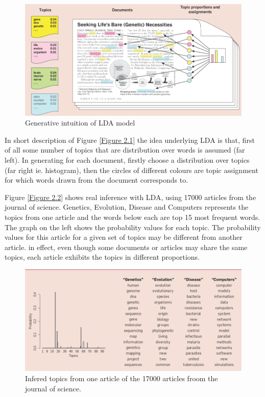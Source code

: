 \begin{figure}[hbtp]
\centering
\includegraphics[scale=0.5]{DLA.png}
\caption{Generative intuition of LDA model}\label{Figure 2.1}
\end{figure}
In short description of Figure \eqref{Figure 2.1} the idea underlying LDA is that, first of all some number of topics that are distribution over words is assumed (far left). In generating for each document, firstly choose a distribution over topics (far right ie. histogram), then the circles of different colours are topic assignment for which words drawn from the document corresponds to.

Figure \eqref{Figure 2.2} shows real inference with LDA, using 17000 articles from the journal of science. Genetics, Evolution, Disease and Computers represents the topics from one article and the words below each are top 15 most frequent words. The graph on the left shows the probability values for each topic.
The probability values for this article for a given set of topics may be different from another article. in effect, even though some documents or articles may share the same topics, each article exhibits the topics in different proportions.
\begin{figure}[hbtp]
\centering
\includegraphics[scale=0.5]{infered_topics.png}
\caption{Infered topics from one article of the 17000 articles froom the journal of science.}
\label{Figure 2.2}
 \end{figure} 
